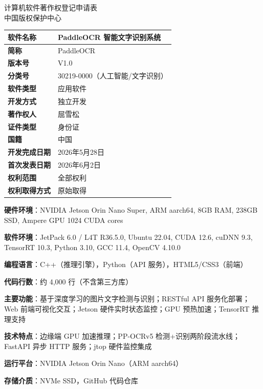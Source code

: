 \documentclass[12pt,a4paper]{ctexart}
\begin{document}
\begin{center}
{\heiti{} 计算机软件著作权登记申请表}\\[0.5cm]
{ 中国版权保护中心}\\[1cm]
\end{center}

\begin{longtable}{|p{4cm}|p{9.5cm}|}
\hline
\textbf{软件名称} & PaddleOCR 智能文字识别系统 \\\hline
\textbf{简称} & PaddleOCR \\\hline
\textbf{版本号} & V1.0 \\\hline
\textbf{分类号} & 30219-0000（人工智能/文字识别） \\\hline
\textbf{软件类型} & 应用软件 \\\hline
\textbf{开发方式} & 独立开发 \\\hline
\textbf{著作权人} & 屈雪松 \\\hline
\textbf{证件类型} & 身份证 \\\hline
\textbf{国籍} & 中国 \\\hline
\textbf{开发完成日期} & 2026年5月28日 \\\hline
\textbf{首次发表日期} & 2026年6月2日 \\\hline
\textbf{权利范围} & 全部权利 \\\hline
\textbf{权利取得方式} & 原始取得 \\\hline
\end{longtable}

\noindent\textbf{硬件环境}：NVIDIA Jetson Orin Nano Super, ARM aarch64, 8GB RAM, 238GB SSD, Ampere GPU 1024 CUDA cores

\noindent\textbf{软件环境}：JetPack 6.0 / L4T R36.5.0, Ubuntu 22.04, CUDA 12.6, cuDNN 9.3, TensorRT 10.3, Python 3.10, GCC 11.4, OpenCV 4.10.0

\noindent\textbf{编程语言}：C++（推理引擎），Python（API 服务），HTML5/CSS3（前端）

\noindent\textbf{代码行数}：约 4,000 行（不含第三方库）

\noindent\textbf{主要功能}：基于深度学习的图片文字检测与识别；RESTful API 服务化部署；Web 前端可视化交互；Jetson 硬件实时状态监控；GPU 预热加速；TensorRT 推理支持

\noindent\textbf{技术特点}：边缘端 GPU 加速推理；PP-OCRv5 检测+识别两阶段流水线；FastAPI 异步 HTTP 服务；jtop 硬件监控集成

\noindent\textbf{运行平台}：NVIDIA Jetson Orin Nano（ARM aarch64）

\noindent\textbf{存储介质}：NVMe SSD，GitHub 代码仓库
\end{document}
